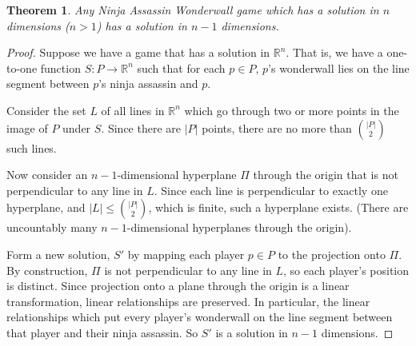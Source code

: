 \documentclass[12pt,x11names, rgb]{article}
\newtheorem*{thm}{Theorem}
\begin{document}
    \begin{thm}
    Any Ninja Assassin Wonderwall game which has a solution in $n$ dimensions ($n > 1$) has a solution in $n-1$ dimensions.
    \end{thm}
    \begin{proof}
    Suppose we have a game that has a solution in $\mathbb{R}^n$. That is, we have a one-to-one function $S: P \to \mathbb{R}^n$ such that for each $p \in P$, $p$'s wonderwall lies on the line segment between $p$'s ninja assassin and $p$. 

    Consider the set $L$ of all lines in $\mathbb{R}^n$ which go through two or more points in the image of $P$ under $S$. Since there are $\lvert P \rvert$ points, there are no more than $\binom{ \lvert P \rvert}{2}$ such lines. 

    Now consider an $n-1$-dimensional hyperplane $\Pi$ through the origin that is not perpendicular to any line in $L$. Since each line is perpendicular to exactly one hyperplane, and $\lvert L \rvert \leq \binom{\lvert P \rvert}{2}$, which is finite, such a hyperplane exists. (There are uncountably many $n-1$-dimensional hyperplanes through the origin).

    Form a new solution, $S'$ by mapping each player $p\in P$ to the projection onto $\Pi$. By construction, $\Pi$ is not perpendicular to any line in $L$, so each player's position is distinct. Since projection onto a plane through the origin is a linear transformation, linear relationships are preserved. In particular, the linear relationships which put every player's wonderwall on the line segment between that player and their ninja assassin. So $S'$ is a solution in $n-1$ dimensions.
    \end{proof}
\end{document}
